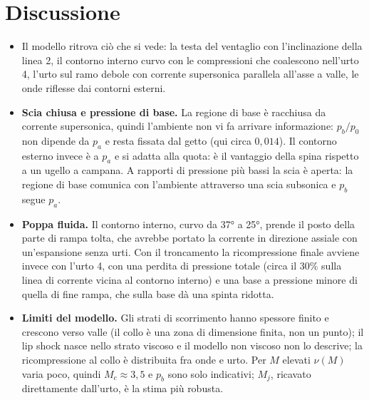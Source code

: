 \section*{Discussione}
\begin{itemize}
\item Il modello ritrova ciò che si vede: la testa del ventaglio con l'inclinazione della linea 2, il contorno
  interno curvo con le compressioni che coalescono nell'urto 4, l'urto sul ramo debole con corrente supersonica
  parallela all'asse a valle, le onde riflesse dai contorni esterni.
\item \textbf{Scia chiusa e pressione di base.} La regione di base è racchiusa da corrente supersonica, quindi
  l'ambiente non vi fa arrivare informazione: $p_b/p_0$ non dipende da $p_a$ e resta fissata dal getto (qui circa
  $0{,}014$). Il contorno esterno invece è a $p_a$ e si adatta alla quota: è il vantaggio della spina rispetto a un
  ugello a campana. A rapporti di pressione più bassi la scia è aperta: la regione di base comunica con l'ambiente
  attraverso una scia subsonica e $p_b$ segue $p_a$.
\item \textbf{Poppa fluida.} Il contorno interno, curvo da \ang{37} a \ang{25}, prende il posto della parte di rampa
  tolta, che avrebbe portato la corrente in direzione assiale con un'espansione senza urti. Con il troncamento la
  ricompressione finale avviene invece con l'urto 4, con una perdita di pressione totale (circa il 30\% sulla linea di
  corrente vicina al contorno interno) e una base a pressione minore di quella di fine rampa, che sulla base dà una
  spinta ridotta.
\item \textbf{Limiti del modello.} Gli strati di scorrimento hanno spessore finito e crescono verso valle (il collo è
  una zona di dimensione finita, non un punto); il lip shock nasce nello strato viscoso e il modello non viscoso non lo
  descrive; la ricompressione al collo è distribuita fra onde e urto. Per $M$ elevati $\nu(M)$ varia poco, quindi
  $M_c\approx3{,}5$ e $p_b$ sono solo indicativi; $M_j$, ricavato direttamente dall'urto, è la stima più robusta.
\end{itemize}


